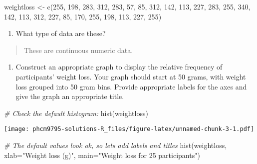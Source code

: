 \documentclass[
]{memoir}
\newenvironment{Shaded}{\begin{snugshade}}{\end{snugshade}}
\newcommand{\AttributeTok}[1]{\textcolor[rgb]{0.77,0.63,0.00}{#1}}
\newcommand{\CommentTok}[1]{\textcolor[rgb]{0.56,0.35,0.01}{\textit{#1}}}
\newcommand{\DecValTok}[1]{\textcolor[rgb]{0.00,0.00,0.81}{#1}}
\newcommand{\FunctionTok}[1]{\textcolor[rgb]{0.00,0.00,0.00}{#1}}
\newcommand{\NormalTok}[1]{#1}
\newcommand{\OtherTok}[1]{\textcolor[rgb]{0.56,0.35,0.01}{#1}}
\newcommand{\StringTok}[1]{\textcolor[rgb]{0.31,0.60,0.02}{#1}}
\providecommand{\tightlist}{%
  \setlength{\itemsep}{0pt}\setlength{\parskip}{0pt}}
\begin{document}
\begin{Shaded}
\begin{Highlighting}[]
\NormalTok{weightloss }\OtherTok{\textless{}{-}} \FunctionTok{c}\NormalTok{(}\DecValTok{255}\NormalTok{, }\DecValTok{198}\NormalTok{, }\DecValTok{283}\NormalTok{, }\DecValTok{312}\NormalTok{, }\DecValTok{283}\NormalTok{, }\DecValTok{57}\NormalTok{,  }\DecValTok{85}\NormalTok{, }\DecValTok{312}\NormalTok{, }\DecValTok{142}\NormalTok{, }\DecValTok{113}\NormalTok{,}
                \DecValTok{227}\NormalTok{, }\DecValTok{283}\NormalTok{, }\DecValTok{255}\NormalTok{, }\DecValTok{340}\NormalTok{, }\DecValTok{142}\NormalTok{, }\DecValTok{113}\NormalTok{, }\DecValTok{312}\NormalTok{, }\DecValTok{227}\NormalTok{,  }\DecValTok{85}\NormalTok{, }\DecValTok{170}\NormalTok{,}
                \DecValTok{255}\NormalTok{, }\DecValTok{198}\NormalTok{, }\DecValTok{113}\NormalTok{, }\DecValTok{227}\NormalTok{, }\DecValTok{255}\NormalTok{)}
\end{Highlighting}
\end{Shaded}

\begin{enumerate}
\def\labelenumi{\alph{enumi})}
\setcounter{enumi}{1}
\tightlist
\item
  What type of data are these?
\end{enumerate}

\begin{quote}
These are continuous numeric data.
\end{quote}

\begin{enumerate}
\def\labelenumi{\alph{enumi})}
\setcounter{enumi}{2}
\tightlist
\item
  Construct an appropriate graph to display the relative frequency of participants' weight loss. Your graph should start at 50 grams, with weight loss grouped into 50 gram bins. Provide appropriate labels for the axes and give the graph an appropriate title.
\end{enumerate}

\begin{Shaded}
\begin{Highlighting}[]
\CommentTok{\# Check the default histogram:}
\FunctionTok{hist}\NormalTok{(weightloss)}
\end{Highlighting}
\end{Shaded}

\texttt{[image: phcm9795-solutions-R\_files/figure-latex/unnamed-chunk-3-1.pdf]}

\begin{Shaded}
\begin{Highlighting}[]
\CommentTok{\# The default values look ok, so let\textquotesingle{}s add labels and titles}
\FunctionTok{hist}\NormalTok{(weightloss, }\AttributeTok{xlab=}\StringTok{"Weight loss (g)"}\NormalTok{, }\AttributeTok{main=}\StringTok{"Weight loss for 25 participants"}\NormalTok{)}
\end{Highlighting}
\end{Shaded}
\end{document}
